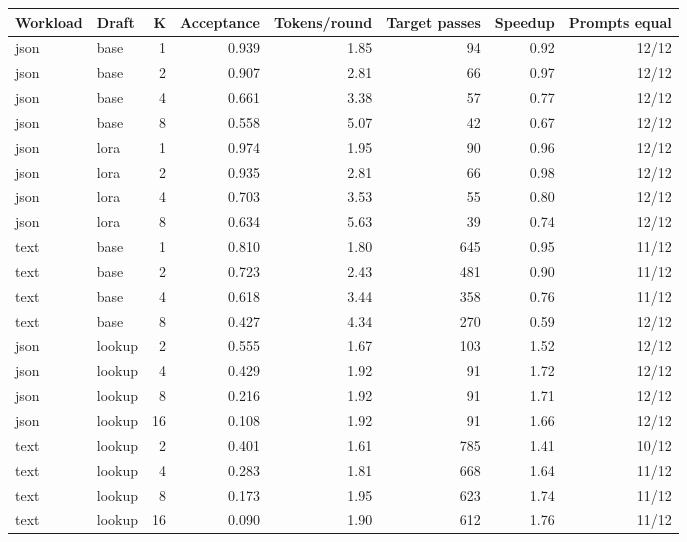 \begin{tabular}{llrrrrrr}
\toprule
Workload & Draft & K & Acceptance & Tokens/round & Target passes & Speedup & Prompts equal \\
\midrule
json & base & 1 & 0.939 & 1.85 & 94 & 0.92 & 12/12 \\
json & base & 2 & 0.907 & 2.81 & 66 & 0.97 & 12/12 \\
json & base & 4 & 0.661 & 3.38 & 57 & 0.77 & 12/12 \\
json & base & 8 & 0.558 & 5.07 & 42 & 0.67 & 12/12 \\
json & lora & 1 & 0.974 & 1.95 & 90 & 0.96 & 12/12 \\
json & lora & 2 & 0.935 & 2.81 & 66 & 0.98 & 12/12 \\
json & lora & 4 & 0.703 & 3.53 & 55 & 0.80 & 12/12 \\
json & lora & 8 & 0.634 & 5.63 & 39 & 0.74 & 12/12 \\
text & base & 1 & 0.810 & 1.80 & 645 & 0.95 & 11/12 \\
text & base & 2 & 0.723 & 2.43 & 481 & 0.90 & 11/12 \\
text & base & 4 & 0.618 & 3.44 & 358 & 0.76 & 11/12 \\
text & base & 8 & 0.427 & 4.34 & 270 & 0.59 & 12/12 \\
json & lookup & 2 & 0.555 & 1.67 & 103 & 1.52 & 12/12 \\
json & lookup & 4 & 0.429 & 1.92 & 91 & 1.72 & 12/12 \\
json & lookup & 8 & 0.216 & 1.92 & 91 & 1.71 & 12/12 \\
json & lookup & 16 & 0.108 & 1.92 & 91 & 1.66 & 12/12 \\
text & lookup & 2 & 0.401 & 1.61 & 785 & 1.41 & 10/12 \\
text & lookup & 4 & 0.283 & 1.81 & 668 & 1.64 & 11/12 \\
text & lookup & 8 & 0.173 & 1.95 & 623 & 1.74 & 11/12 \\
text & lookup & 16 & 0.090 & 1.90 & 612 & 1.76 & 11/12 \\
\bottomrule
\end{tabular}
